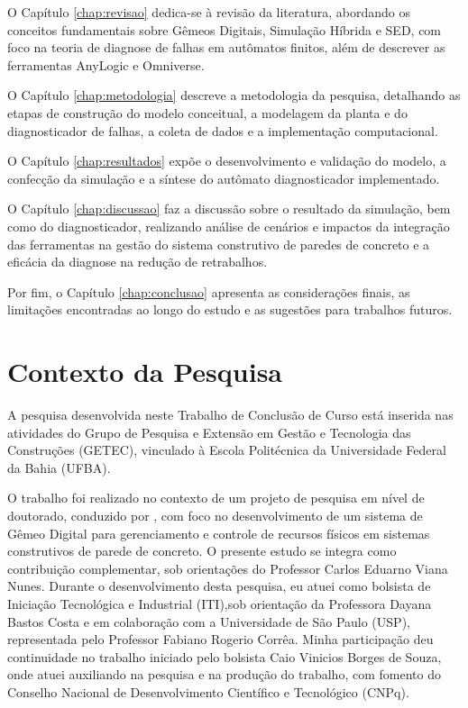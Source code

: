 O Capítulo \ref{chap:revisao} dedica-se à revisão da literatura, abordando os conceitos fundamentais sobre Gêmeos Digitais, Simulação Híbrida e SED, com foco na teoria de diagnose de falhas em autômatos finitos, além de descrever as ferramentas AnyLogic e Omniverse.

O Capítulo \ref{chap:metodologia} descreve a metodologia da pesquisa, detalhando as etapas de construção do modelo conceitual, a modelagem da planta e do diagnosticador de falhas, a coleta de dados e a implementação computacional.

O Capítulo \ref{chap:resultados} expõe o desenvolvimento e validação do modelo, a confecção da simulação e a síntese do autômato diagnosticador implementado.

O Capítulo \ref{chap:discussao} faz a discussão sobre o resultado da simulação, bem como do diagnosticador, realizando análise de cenários e impactos da integração das ferramentas na gestão do sistema construtivo de paredes de concreto e a eficácia da diagnose na redução de retrabalhos.

Por fim, o Capítulo \ref{chap:conclusao} apresenta as considerações finais, as limitações encontradas ao longo do estudo e as sugestões para trabalhos futuros.

\section{Contexto da Pesquisa}
A pesquisa desenvolvida neste Trabalho de Conclusão de Curso está inserida nas atividades do Grupo de Pesquisa e Extensão em Gestão e Tecnologia das Construções (GETEC), vinculado à Escola Politécnica da Universidade Federal da Bahia (UFBA).

O trabalho foi realizado no contexto de um projeto de pesquisa em nível de doutorado, conduzido por , com foco no desenvolvimento de um sistema de Gêmeo Digital para gerenciamento e controle de recursos físicos em sistemas construtivos de parede de concreto. O presente estudo se integra como contribuição complementar, sob orientações do Professor Carlos Eduarno Viana Nunes. Durante o desenvolvimento desta pesquisa, eu atuei como bolsista de Iniciação Tecnológica e Industrial (ITI),sob orientação da Professora Dayana Bastos Costa e em colaboração com a Universidade de São Paulo (USP), representada pelo Professor Fabiano Rogerio Corrêa. Minha participação deu continuidade no trabalho iniciado pelo bolsista Caio Vinicios Borges de Souza, onde atuei auxiliando na pesquisa e na produção do trabalho, com fomento do Conselho Nacional de Desenvolvimento Científico e Tecnológico (CNPq).

